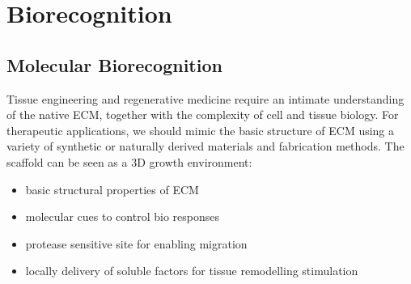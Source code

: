 \graphicspath{{chapters/05/images/}}
\chapter{Biorecognition}

\section{Molecular Biorecognition}
Tissue engineering and regenerative medicine require an intimate understanding of the native ECM, together with the complexity of cell and tissue biology. For therapeutic applications, we should mimic the basic structure of ECM using a variety of synthetic or naturally derived materials and fabrication methods.
The scaffold can be seen as a 3D growth environment:
\begin{itemize}
\item basic structural properties of ECM
\item molecular cues to control bio responses
\item protease sensitive site for enabling migration
\item locally delivery of soluble factors for tissue remodelling stimulation
\end{itemize}

